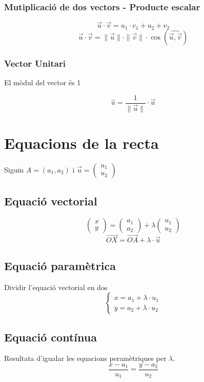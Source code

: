 \documentclass[12pt,a4paper]{article}
\newcommand{\module}[1]{\|#1\|}
\begin{document}
\subsubsection{Mutiplicació de dos vectors - Producte  escalar}

$$\Vec{u} \cdot \Vec{v} = u_1 \cdot v_1 + u_2 + v_2$$
$$\Vec{u} \cdot \vec{v} = \module{\Vec{u}} \cdot \module{\Vec{v}} \cdot \cos\left({\widehat{\Vec{u}, \Vec{v}}}\right)$$
\subsubsection{Vector Unitari}
El mòdul del vector és 1

$$\hat{u} = \dfrac{1}{\module{\Vec{u}}} \cdot \vec{u}$$

\section{Equacions de la recta}

Siguin $A = \left( a_1, a_2 \right)$ i $\Vec{u}=\begin{pmatrix}
    u_1 \\
    u_2
\end{pmatrix}$

\subsection{Equació vectorial}
$$
\begin{pmatrix}
    x \\
    y
\end{pmatrix}
=
\begin{pmatrix}
    a_1 \\
    a_2
\end{pmatrix}
+ \lambda
\begin{pmatrix}
    u_1 \\
    u_2
\end{pmatrix}
$$
$$\Vec{OX} = \Vec{OA} + \lambda \cdot \Vec{u}$$
\subsection{Equació paramètrica}
Dividir l'equació vectorial en dos
\[
\begin{cases}
    x = a_1 + \lambda \cdot u_1 \\
    y = a_2 + \lambda \cdot u_2
\end{cases}\]

\subsection{Equació contínua}
Resultata d'igualar les equacions peramètriques per $\lambda$.
$$
\frac{x-a_1}{u_1} = \frac{y-a_2}{u_2}
$$
\end{document}

